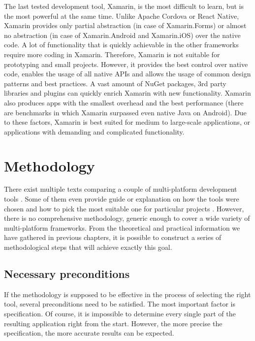 \documentclass[english,master,public,dept460,male,cpdeclaration,oneside]{diploma}
\begin{document}
The last tested development tool, Xamarin, is the most difficult to learn, but is the most powerful at the same time. Unlike Apache Cordova or React Native, Xamarin provides only partial abstraction (in case of Xamarin.Forms) or almost no abstraction (in case of Xamarin.Android and Xamarin.iOS) over the native code. A lot of functionality that is quickly achievable in the other frameworks require more coding in Xamarin. Therefore, Xamarin is not suitable for prototyping and small projects. However, it provides the best control over native code, enables the usage of all native APIs and allows the usage of common design patterns and best practices. A vast amount of NuGet packages, 3rd party libraries and plugins can quickly enrich Xamarin with new functionality. Xamarin also produces apps with the smallest overhead and the best performance (there are benchmarks in which Xamarin surpassed even native Java on Android). Due to these factors, Xamarin is best suited for medium to large-scale applications, or applications with demanding and complicated functionality.



\section{Methodology}

There exist multiple texts comparing a couple of multi-platform development tools \cite{aarhus} \cite{uppsala} \cite{taxonomyCP}. Some of them even provide guide or explanation on how the tools were chosen and how to pick the most suitable one for particular projects \cite{rhoMobile} \cite{aComparativeStudy}. However, there is no comprehensive methodology, generic enough to cover a wide variety of multi-platform frameworks. From the theoretical and practical information we have gathered in previous chapters, it is possible to construct a series of methodological steps that will achieve exactly this goal.

\subsection{Necessary preconditions}
If the methodology is supposed to be effective in the process of selecting the right tool, several preconditions need to be satisfied. The most important factor is specification. Of course, it is impossible to determine every single part of the resulting application right from the start. However, the more precise the specification, the more accurate results can be expected. 
\end{document}
